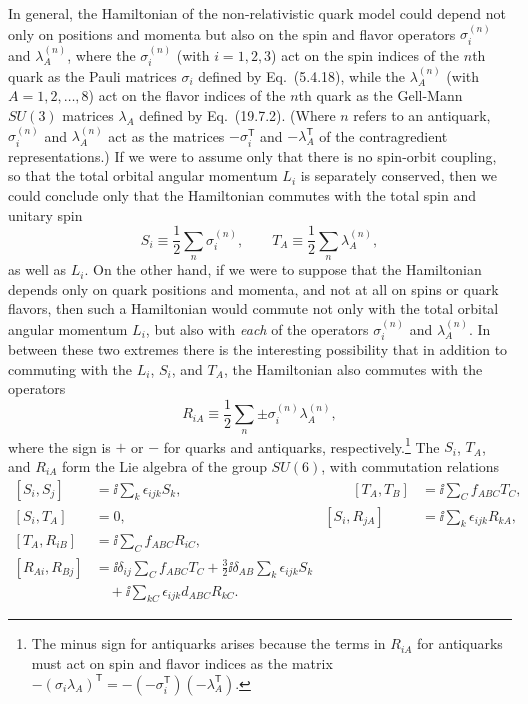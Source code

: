In general, the Hamiltonian of the non-relativistic quark model could depend not
only on positions and momenta but also on the spin and flavor operators
$\sigma_i^{(n)}$ and $\lambda_A^{(n)}$, where the $\sigma_i^{(n)}$ (with
$i=1,2,3$) act on the spin indices of the $n$th quark as the Pauli matrices
$\sigma_i$ defined by Eq.~(5.4.18), while the $\lambda_A^{(n)}$ (with
$A=1,2,\ldots,8$) act on the flavor indices of the $n$th quark as the
Gell-Mann $SU(3)$ matrices $\lambda_A$ defined by Eq.~(19.7.2). (Where $n$
refers to an antiquark, $\sigma_i^{(n)}$ and $\lambda_A^{(n)}$ act as the
matrices $-\sigma_i^{\mathsf T}$ and $-\lambda_A^{\mathsf T}$ of the contragredient
representations.) If we were to assume only that there is no spin-orbit
coupling, so that the total orbital angular momentum $L_i$ is separately
conserved, then we could conclude only that the Hamiltonian commutes with the
total spin and unitary spin
\begin{equation}
 S_i\equiv\frac{1}{2}\sum_n\sigma_i^{(n)},
 \qquad
 T_A\equiv\frac{1}{2}\sum_n\lambda_A^{(n)},
 \tag{24.A.1}\label{eq:24.A.1}
\end{equation}
as well as $L_i$. On the other hand, if we were to suppose that the Hamiltonian
depends only on quark positions and momenta, and not at all on spins or quark
flavors, then such a Hamiltonian would commute not only with the total orbital
angular momentum $L_i$, but also with \emph{each} of the operators
$\sigma_i^{(n)}$ and $\lambda_A^{(n)}$. In between these two extremes there is
the interesting possibility that in addition to commuting with the $L_i$,
$S_i$, and $T_A$, the Hamiltonian also commutes with the operators
\begin{equation}
 R_{iA}\equiv\frac{1}{2}\sum_n\mathord{\pm}
 \sigma_i^{(n)}\lambda_A^{(n)},
 \tag{24.A.2}\label{eq:24.A.2}
\end{equation}
where the sign is $+$ or $-$ for quarks and antiquarks,
respectively.\footnote{The minus sign for antiquarks arises because the terms
in $R_{iA}$ for antiquarks must act on spin and flavor indices as the matrix
$-(\sigma_i\lambda_A)^{\mathsf T}=-(-\sigma_i^{\mathsf T})(-\lambda_A^{\mathsf T})$.} The $S_i$, $T_A$, and
$R_{iA}$ form the Lie algebra of the group $SU(6)$, with commutation relations
\begin{equation}
\begin{aligned}
 [S_i,S_j]&=\ii\sum_k\epsilon_{ijk}S_k,
 &\qquad [T_A,T_B]&=\ii\sum_C f_{ABC}T_C,
 \\[2pt]
 [S_i,T_A]&=0,
 & [S_i,R_{jA}]&=\ii\sum_k\epsilon_{ijk}R_{kA},
 \\[2pt]
 [T_A,R_{iB}]&=\ii\sum_C f_{ABC}R_{iC},
 \\[2pt]
 [R_{Ai},R_{Bj}]&=\ii\delta_{ij}\sum_C f_{ABC}T_C
 +\frac{3}{2}\ii\delta_{AB}\sum_k\epsilon_{ijk}S_k
 \\[-1pt]
 &\quad+\ii\sum_{kC}\epsilon_{ijk}d_{ABC}R_{kC}.
\end{aligned}
\tag{24.A.3}\label{eq:24.A.3}
\end{equation}
